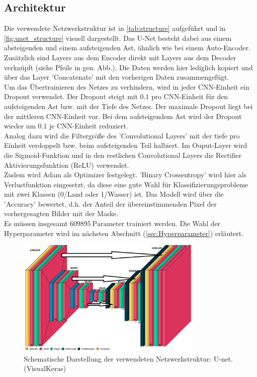 \subsection{Architektur}
Die verwendete Netzwerkstruktur ist in \autoref{tab:structure} aufgeführt und in \autoref{fig:unet_structure} visuell dargestellt.
Das U-Net besteht dabei aus einem absteigenden und einem aufsteigenden Ast, ähnlich wie bei einem Auto-Encoder.
Zusätzlich sind Layers aus dem Encoder direkt mit Layers aus dem Decoder verknüpft (siehe Pfeile in gen. Abb.).
Die Daten werden hier lediglich kopiert und über das Layer 'Concatenate' mit den vorherigen Daten zusammengefügt.
\\
Um das Übertrainieren des Netzes zu verhindern, wird in jeder CNN-Einheit ein Dropout verwendet.
Der Dropout steigt mit $0.1$ pro CNN-Einheit für den aufsteigenden Ast bzw. mit der Tiefe des Netzes.
Der maximale Dropout liegt bei der mittleren CNN-Einheit vor.
Bei dem aufsteigendem Ast wird der Dropout wieder um $0.1$ je CNN-Einheit reduziert.
\\
Analog dazu wird die Filtergröße des 'Convolutional Layers' mit der tiefe pro Einheit verdoppelt bzw. beim aufsteigenden Teil halbiert.
Im Ouput-Layer wird die Sigmoid-Funktion und in den restlichen Convolutional Layers die Rectifier Aktivierungsfunktion (ReLU) verwendet.
\\
Zudem wird Adam als Optimizer festgelegt.
'Binary Crossentropy' wird hier als Verlustfunktion eingesetzt, da diese eine gute Wahl für Klassifizierungsprobleme mit zwei Klassen ($0$/Land oder $1$/Wasser) ist.
Das Modell wird über die 'Accuracy' bewertet, d.h. der Anteil der übereinstimmenden Pixel der vorhergesagten Bilder mit der Maske.
\\
Es müssen insgesamt $\SI{609895}{\text{Parameter}}$ trainiert werden.
Die Wahl der Hyperparameter wird im nächsten Abschnitt (\autoref{sec:Hyperparameter}) erläutert.
\begin{figure}
    \centering
    \includegraphics[width=0.8\textwidth]{content/img/unet_struc_bearbeitet_2.png}
    \caption{Schematische Darstellung der verwendeten Netzwerkstruktur: U-net. (VisualKeras)}
    \label{fig:unet_structure}
\end{figure}

